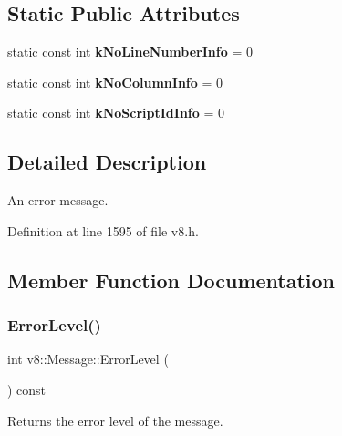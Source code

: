 \subsection*{Static Public Attributes}
\begin{DoxyCompactItemize}
\item 
\mbox{\label{classv8_1_1Message_a35649a6c0c813ba82c9886a2b17da124}} 
static const int {\bfseries k\+No\+Line\+Number\+Info} = 0
\item 
\mbox{\label{classv8_1_1Message_a8cb643dbf408b0fd2526b23a8202c4a6}} 
static const int {\bfseries k\+No\+Column\+Info} = 0
\item 
\mbox{\label{classv8_1_1Message_a5aac643173466e88544cb1daa74553d6}} 
static const int {\bfseries k\+No\+Script\+Id\+Info} = 0
\end{DoxyCompactItemize}


\subsection{Detailed Description}
An error message. 

Definition at line 1595 of file v8.\+h.



\subsection{Member Function Documentation}
\mbox{\label{classv8_1_1Message_a91bb679f695d82c2c2228645ca4497c6}} 
\subsubsection{\texorpdfstring{Error\+Level()}{ErrorLevel()}}
{\footnotesize\ttfamily int v8\+::\+Message\+::\+Error\+Level (\begin{DoxyParamCaption}{ }\end{DoxyParamCaption}) const}

Returns the error level of the message. \mbox{\label{classv8_1_1Message_ae188ca2457adbb3628681782bc757dc8}} 
